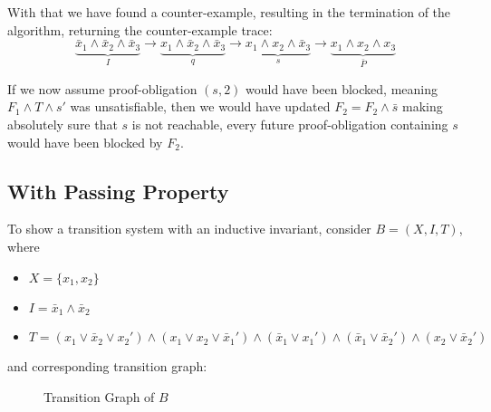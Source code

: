 \documentclass[11pt, a4paper, BCOR=10mm, ngerman, oneside]{scrbook}
\begin{document}
With that we have found a counter-example, resulting in the termination of the algorithm, returning the counter-example trace: 
\begin{equation*}
\underbrace{\bar x_1 \land \bar x_2 \land \bar x_3}_{I} \rightarrow \underbrace{x_1 \land \bar x_2 \land \bar x_3}_{q} \rightarrow \underbrace{x_1 \land x_2 \land \bar x_3}_{s} \rightarrow \underbrace{x_1 \land x_2 \land x_3}_{\bar P}   
\end{equation*}

If we now assume proof-obligation $(s, 2)$ would have been blocked, meaning $F_1 \land T \land s'$ was unsatisfiable, then we would have updated $F_2 = F_2 \land \bar s$ making absolutely sure that $s$ is not reachable, every future proof-obligation containing $s$ would have been blocked by $F_2$.

\pagebreak

\subsection{With Passing Property}
To show a transition system with an inductive invariant, consider $B = (X, I, T)$, where
\begin{itemize}
\item $X = \{x_1, x_2\}$
\item $I = \bar x_1 \land \bar x_2 $
\item  $T = ( x_1 \lor \bar x_2 \lor x_2') \land (x_1 \lor x_2 \lor \bar x_1') \land (\bar x_1 \lor x_1') \land (\bar x_1 \lor \bar x_2') \land (x_2 \lor \bar x_2')$
\end{itemize}
and corresponding transition graph: \par

\begin{figure}[H]
\centering
{}
  \caption{Transition Graph of $B$}
 \end{figure}
 \label{ex1}  
\end{document}
